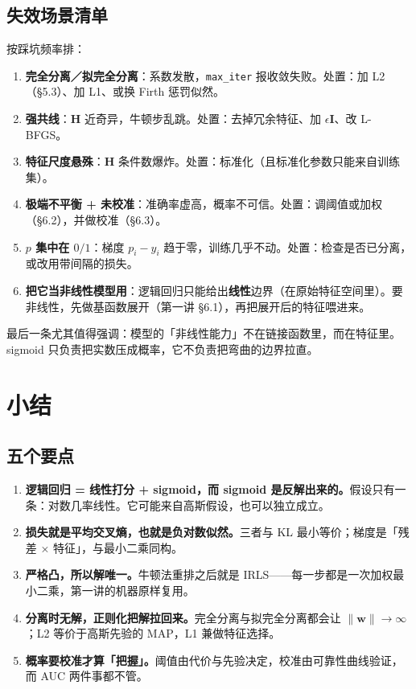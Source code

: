 \documentclass[11pt,a4paper,fontset=windows,zihao=-4]{ctexart}
\newcommand{\bw}{\mathbf{w}}
\newcommand{\bI}{\mathbf{I}}
\newcommand{\bH}{\mathbf{H}}
\newcommand{\norm}[1]{\lVert #1\rVert}
\begin{document}
\subsection{失效场景清单}

按踩坑频率排：

\begin{enumerate}[label=\textcolor{navy}{\bfseries\arabic*.},leftmargin=2.0em,itemsep=0.45em]
  \item \textbf{完全分离／拟完全分离}：系数发散，\texttt{max\_iter} 报收敛失败。处置：加 L2（\S5.3）、加 L1、或换 Firth 惩罚似然。
  \item \textbf{强共线}：$\bH$ 近奇异，牛顿步乱跳。处置：去掉冗余特征、加 $\epsilon\bI$、改 L-BFGS。
  \item \textbf{特征尺度悬殊}：$\bH$ 条件数爆炸。处置：标准化（且标准化参数只能来自训练集）。
  \item \textbf{极端不平衡 + 未校准}：准确率虚高，概率不可信。处置：调阈值或加权（\S6.2），并做校准（\S6.3）。
  \item \textbf{$p$ 集中在 $0/1$}：梯度 $p_i-y_i$ 趋于零，训练几乎不动。处置：检查是否已分离，或改用带间隔的损失。
  \item \textbf{把它当非线性模型用}：逻辑回归只能给出\textbf{线性}边界（在原始特征空间里）。要非线性，先做基函数展开（第一讲 \S6.1），再把展开后的特征喂进来。
\end{enumerate}

最后一条尤其值得强调：模型的「非线性能力」不在链接函数里，而在特征里。sigmoid 只负责把实数压成概率，它不负责把弯曲的边界拉直。


\section{小结}

\subsection{五个要点}

\begin{enumerate}[label=\textcolor{navy}{\bfseries\arabic*.},leftmargin=2.3em,itemsep=0.55em]
  \item \textbf{逻辑回归 = 线性打分 + sigmoid，而 sigmoid 是反解出来的。}假设只有一条：对数几率线性。它可能来自高斯假设，也可以独立成立。
  \item \textbf{损失就是平均交叉熵，也就是负对数似然。}三者与 KL 最小等价；梯度是「残差 × 特征」，与最小二乘同构。
  \item \textbf{严格凸，所以解唯一。}牛顿法重排之后就是 IRLS——每一步都是一次加权最小二乘，第一讲的机器原样复用。
  \item \textbf{分离时无解，正则化把解拉回来。}完全分离与拟完全分离都会让 $\norm{\bw}\to\infty$；L2 等价于高斯先验的 MAP，L1 兼做特征选择。
  \item \textbf{概率要校准才算「把握」。}阈值由代价与先验决定，校准由可靠性曲线验证，而 AUC 两件事都不管。
\end{enumerate}
\end{document}
